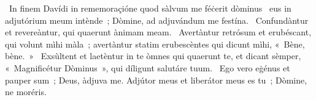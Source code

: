 {~In finem Davídi in rememoraçióne quod sàlvum me féċerit dòminus}
{%
~eus in adjutórium meum intènde~; Dòmine, ad adjuvándum me festína.
~Confundàntur et revereàntur, qui quaerunt ànimam meam.
~Avertàntur retrósum et erubéscant, qui volunt mìhi màla~; avertàntur statim erubescèntes qui dicunt mìhi, «~Bène, bène.~»
~Exsùltent et laetèntur in te òmnes qui quaerunt te, et dicant sèmper, «~Magnificétur Dòminus~», qui díligunt salutáre tuum.
~Ego vero eġénus et pauper sum~; Deus, àdjuva me. Adjútor meus et liberátor meus es tu~; Dòmine, ne moréris.}
